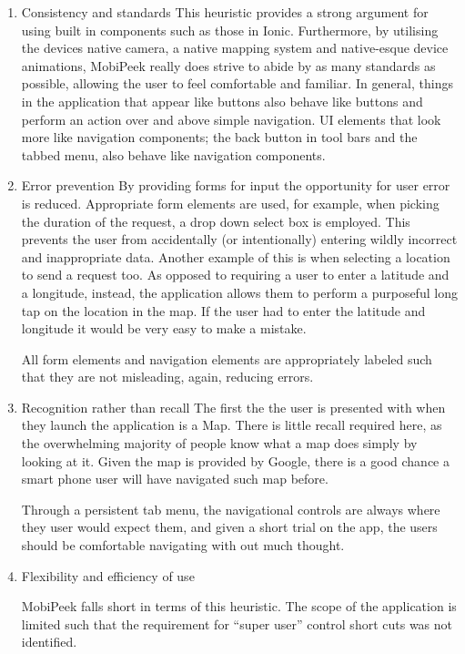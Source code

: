 \documentclass[a4paper]{article}
\begin{document}
\begin{enumerate}
\item Consistency and standards
This heuristic provides a strong argument for using built in components such as those in Ionic. Furthermore, by utilising the devices native camera, a native mapping system and native-esque device animations, MobiPeek really does strive to abide by as many standards as possible, allowing the user to feel comfortable and familiar. In general, things in the application that appear like buttons also behave like buttons and perform an action over and above simple navigation. UI elements that look more like navigation components; the back button in tool bars and the tabbed menu, also behave like navigation components.

\item Error prevention
By providing forms for input the opportunity for user error is reduced. Appropriate form elements are used, for example, when picking the duration of the request, a drop down select box is employed. This prevents the user from accidentally (or intentionally) entering wildly incorrect and inappropriate data. Another example of this is when selecting a location to send a request too. As opposed to requiring a user to enter a latitude and a longitude, instead, the application allows them to perform a purposeful long tap on the location in the map. If the user had to enter the latitude and longitude it would be very easy to make a mistake.

All form elements and navigation elements are appropriately labeled such that they are not misleading, again, reducing errors. 

\item Recognition rather than recall
The first the the user is presented with when they launch the application is a Map. There is little recall required here, as the overwhelming majority of people know what a map does simply by looking at it. Given the map is provided by Google, there is a good chance a smart phone user will have navigated such map before.

Through a persistent tab menu, the navigational controls are always where they user would expect them, and given a short trial on the app, the users should be comfortable navigating with out much thought.
 
\item Flexibility and efficiency of use

MobiPeek falls short in terms of this heuristic. The scope of the application is limited such that the requirement for ``super user'' control short cuts was not identified.


\end{enumerate}
\end{document}
